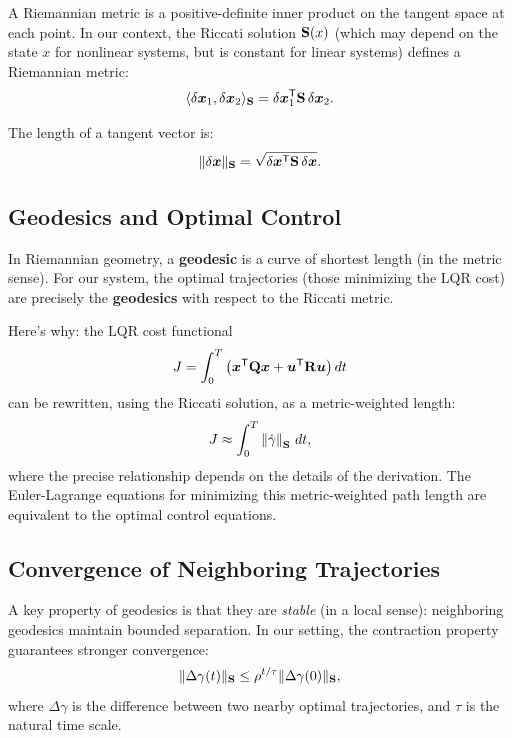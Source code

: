 A Riemannian metric is a positive-definite inner product on the tangent space at each point. In our context, the Riccati
solution $\mathbf{S}(x)$ (which may depend on the state $x$ for nonlinear systems, but is constant for linear systems) defines
a Riemannian metric:
\begin{equation}
\langle \delta\bm{x}_1, \delta\bm{x}_2 \rangle_{\mathbf{S}} = \delta\bm{x}_1^{\mathsf{T}}\mathbf{S}\,\delta\bm{x}_2.
\label{eq:ch6:riemannian-metric}
\end{equation}

The length of a tangent vector is:
\begin{equation}
\|\delta\bm{x}\|_{\mathbf{S}} = \sqrt{\delta\bm{x}^{\mathsf{T}}\mathbf{S}\,\delta\bm{x}}.
\label{eq:ch6:metric-norm}
\end{equation}

\subsection{Geodesics and Optimal Control}

In Riemannian geometry, a \textbf{geodesic} is a curve of shortest length (in the metric sense). For our system, the
optimal trajectories (those minimizing the LQR cost) are precisely the \textbf{geodesics} with respect to the Riccati
metric.

Here's why: the LQR cost functional
\begin{equation}
J = \int_0^T \left(\bm{x}^{\mathsf{T}}\mathbf{Q}\bm{x} + \bm{u}^{\mathsf{T}}\mathbf{R}\bm{u}\right) dt
\label{eq:ch6:lqr-cost-again}
\end{equation}
can be rewritten, using the Riccati solution, as a metric-weighted length:
\begin{equation}
J \approx \int_0^T \left\lVert \dot{\gamma} \right\rVert_{\mathbf{S}} \, dt,
\label{eq:ch6:geodesic-length}
\end{equation}
where the precise relationship depends on the details of the derivation. The Euler-Lagrange equations for minimizing this
metric-weighted path length are equivalent to the optimal control equations.

\subsection{Convergence of Neighboring Trajectories}

A key property of geodesics is that they are \textit{stable} (in a local sense): neighboring geodesics maintain bounded
separation. In our setting, the contraction property guarantees stronger convergence:
\begin{equation}
\|\Delta \gamma(t)\|_{\mathbf{S}} \leq \rho^{t/\tau} \|\Delta \gamma(0)\|_{\mathbf{S}},
\label{eq:ch6:geodesic-convergence}
\end{equation}
where $\Delta\gamma$ is the difference between two nearby optimal trajectories, and $\tau$ is the natural time scale.

